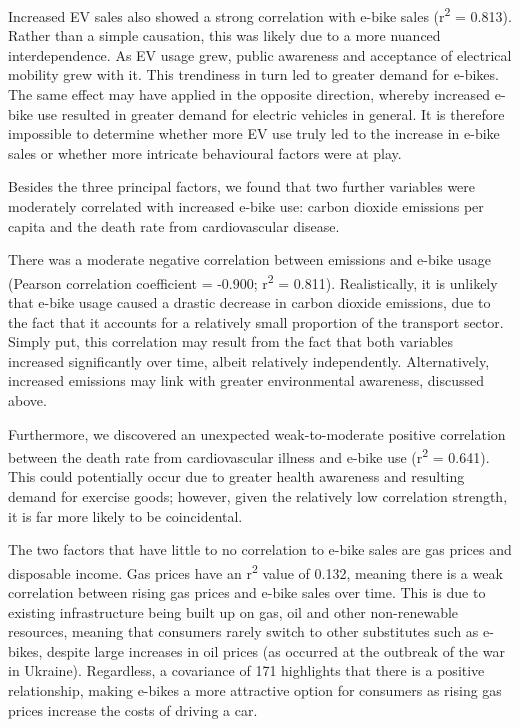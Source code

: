 Increased EV sales also showed a strong correlation with e-bike sales (r\textsuperscript{2} = 0.813). Rather than a simple causation, this was likely due to a more nuanced interdependence. As EV usage grew, public awareness and acceptance of electrical mobility grew with it. This trendiness in turn led to greater demand for e-bikes. The same effect may have applied in the opposite direction, whereby increased e-bike use resulted in greater demand for electric vehicles in general. It is therefore impossible to determine whether more EV use truly led to the increase in e-bike sales or whether more intricate behavioural factors were at play.

Besides the three principal factors, we found that two further variables were moderately correlated with increased e-bike use: carbon dioxide emissions per capita and the death rate from cardiovascular disease.

There was a moderate negative correlation between emissions and e-bike usage (Pearson correlation coefficient = -0.900; r\textsuperscript{2} = 0.811). Realistically, it is unlikely that e-bike usage caused a drastic decrease in carbon dioxide emissions, due to the fact that it accounts for a relatively small proportion of the transport sector. Simply put, this correlation may result from the fact that both variables increased significantly over time, albeit relatively independently. Alternatively, increased emissions may link with greater environmental awareness, discussed above.

Furthermore, we discovered an unexpected weak-to-moderate positive correlation between the death rate from cardiovascular illness and e-bike use (r\textsuperscript{2} = 0.641). This could potentially occur due to greater health awareness and resulting demand for exercise goods; however, given the relatively low correlation strength, it is far more likely to be coincidental.

The two factors that have little to no correlation to e-bike sales are gas prices and disposable income. Gas prices have an r\textsuperscript{2} value of 0.132, meaning there is a weak correlation between rising gas prices and e-bike sales over time. This is due to existing infrastructure being built up on gas, oil and other non-renewable resources, meaning that consumers rarely switch to other substitutes such as e-bikes, despite large increases in oil prices (as occurred at the outbreak of the war in Ukraine). Regardless, a covariance of 171 highlights that there is a positive relationship, making e-bikes a more attractive option for consumers as rising gas prices increase the costs of driving a car.

